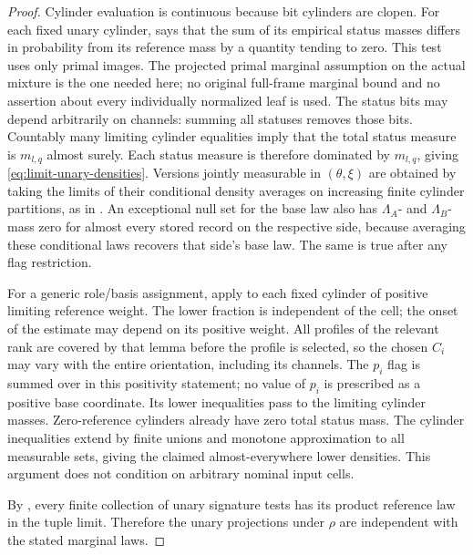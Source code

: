 \begin{proof}
Cylinder evaluation is continuous because bit cylinders are clopen.
For each fixed unary cylinder,  says that the sum
of its empirical status masses differs in probability from its reference
mass by a quantity tending to zero. This test uses only primal images.
The projected primal marginal assumption on the actual mixture is the
one needed here; no original full-frame marginal bound and no assertion
about every individually normalized leaf is used. The status bits may
depend arbitrarily on channels: summing all statuses removes those bits. Countably many limiting cylinder equalities imply that
the total status measure is $m_{l,q}$ almost surely. Each status measure
is therefore dominated by $m_{l,q}$, giving
\eqref{eq:limit-unary-densities}. Versions jointly measurable in
$(\theta,\xi)$ are obtained by taking the limits of their conditional
density averages on increasing finite cylinder partitions, as in
. An exceptional null set for the base law
also has $\Lambda_A$- and $\Lambda_B$-mass zero for almost every stored
record on the respective side, because averaging these conditional laws
recovers that side's base law. The same is true after any flag restriction.

For a generic role/basis assignment, apply
 to each fixed cylinder of positive limiting
reference weight. The lower fraction is independent of the cell;
the onset of the estimate may depend on its positive weight. All
profiles of the relevant rank are covered by that lemma before the
profile is selected, so the chosen $C_i$ may vary with the entire
orientation, including its channels. The $p_i$ flag is summed over in
this positivity statement; no value of $p_i$ is prescribed as a positive
base coordinate. Its lower inequalities pass to
the limiting cylinder masses. Zero-reference cylinders already have
zero total status mass. The cylinder inequalities extend by finite
unions and monotone approximation to all measurable sets, giving the
claimed almost-everywhere lower densities. This argument does not
condition on arbitrary nominal input cells.

By , every finite collection of unary
signature tests has its product reference law in the tuple limit.
Therefore the unary projections under $\rho$ are independent with the
stated marginal laws.


\end{proof}
